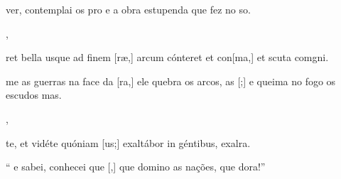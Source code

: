 {    {\item {} ver, contemplai os pro e a obra estupenda que fez no so.~\Antiphona},
  {\item {}ret bella usque ad finem [ræ,] arcum cónteret et con[ma,] et scuta comgni.~\Antiphona}%
    {\item {}me as guerras na face da [ra,] ele quebra os arcos, as [;] e queima no fogo os escudos mas.~\Antiphona},
  {\item {}te, et vidéte quóniam [us;] exaltábor in géntibus, exalra.~\Antiphona}%
    {\item {}`` e sabei, conhecei que [,] que domino as nações, que dora!''~\Antiphona}
}
